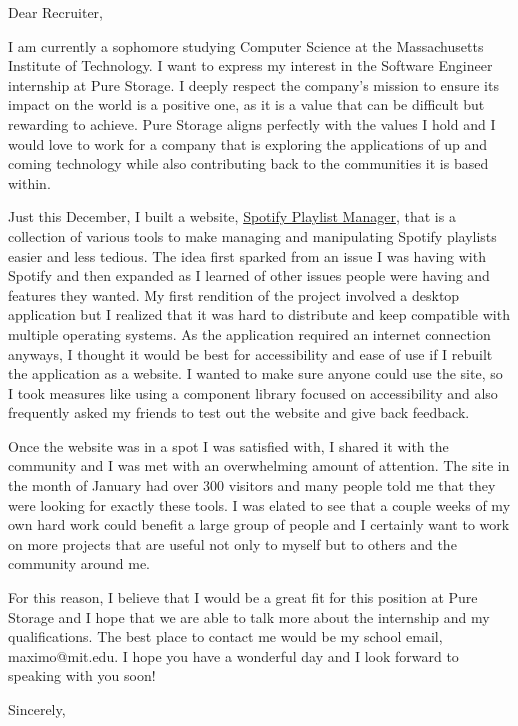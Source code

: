 \documentclass[12pt]{letter}
\begin{document}
\begin{letter}{}
    \opening{Dear Recruiter,}
    I am currently a sophomore studying Computer Science at the Massachusetts Institute of Technology.
    I want to express my interest in the Software Engineer internship at Pure Storage.
    I deeply respect the company's mission to ensure its impact on the world is a positive one, as it is a value that can be difficult but rewarding to achieve.
    Pure Storage aligns perfectly with the values I hold and I would love to work for a company that is exploring the applications of up and coming technology
    while also contributing back to the communities it is based within.

    Just this December, I built a website, \href{https://www.spotifyplaylistmanager.net}{Spotify Playlist Manager}, that is a collection of various tools to make
    managing and manipulating Spotify playlists easier and less tedious. The idea first sparked from an issue I was having with Spotify and then expanded as I learned
    of other issues people were having and features they wanted. My first rendition of the project involved a desktop application but I realized that it was
    hard to distribute and keep compatible with multiple operating systems. As the application required an internet connection anyways, I thought it would be
    best for accessibility and ease of use if I rebuilt the application as a website. I wanted to make sure anyone could use the site, so I took measures
    like using a component library focused on accessibility and also frequently asked my friends to test out the website and give back feedback.

    Once the website was in a spot I was satisfied with, I shared it with the community and I was met with an overwhelming amount of attention.
    The site in the month of January had over 300 visitors and many people told me that they were looking for exactly these tools.
    I was elated to see that a couple weeks of my own hard work could benefit a large group of people and I certainly want to work on more projects
    that are useful not only to myself but to others and the community around me.

    For this reason, I believe that I would be a great fit for this position at Pure Storage and I hope that we are able to talk more about the internship and my qualifications.
    The best place to contact me would be my school email, maximo@mit.edu. I hope you have a wonderful day and I look forward to speaking with you soon!
    \closing{Sincerely,}
\end{letter}
\end{document}
